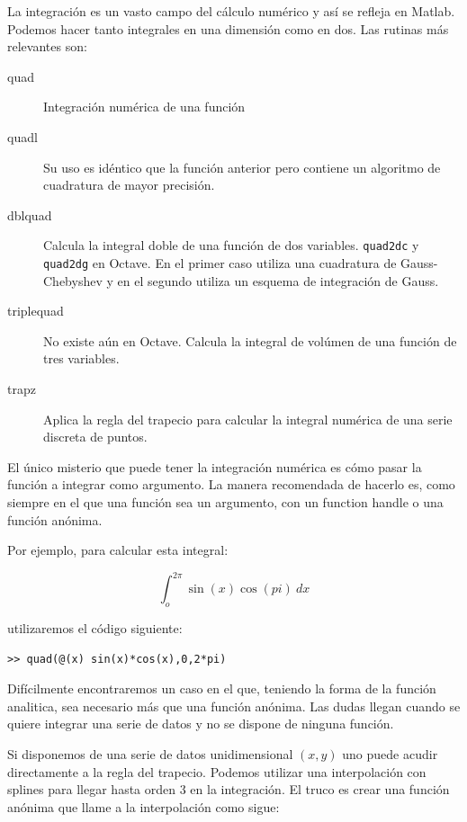 La integración es un vasto campo del cálculo numérico y así
se refleja en Matlab. Podemos hacer tanto integrales en una dimensión
como en dos. Las rutinas más relevantes son:

\begin{description}
\item [quad\texttt{}]Integración numérica de una función
\item [quadl\texttt{}]Su uso es idéntico que la función
  anterior pero contiene un algoritmo de cuadratura de mayor
  precisión.
\item [dblquad\texttt{}] Calcula la integral
  doble de una función de dos variables. \texttt{quad2dc}
  y \texttt{quad2dg} en Octave.  En el primer caso
  utiliza una cuadratura de Gauss-Chebyshev y en el segundo utiliza un
  esquema de integración de Gauss.
\item [triplequad\texttt{}]No existe aún en Octave.
  Calcula la integral de volúmen de una función de tres variables.
\item [trapz\texttt{}]Aplica la regla del trapecio para
  calcular la integral numérica de una serie discreta de puntos.
\end{description}

El único misterio que puede tener la integración numérica es cómo
pasar la función a integrar como argumento.  La manera recomendada de
hacerlo es, como siempre en el que una función sea un argumento, con
un function handle o una función anónima.

Por ejemplo, para calcular esta integral:

\[  \int_o^{2\pi} \sin(x)\cos(pi)\ dx\]

utilizaremos el código siguiente:

\begin{verbatim}
>> quad(@(x) sin(x)*cos(x),0,2*pi)
\end{verbatim}

Difícilmente encontraremos un caso en el que, teniendo la forma de la
función analitica, sea necesario más que una función anónima.  Las
dudas llegan cuando se quiere integrar una serie de datos y no se
dispone de ninguna función.

Si disponemos de una serie de datos unidimensional $(x,y)$ uno puede
acudir directamente a la regla del trapecio.  Podemos utilizar una
interpolación con splines para llegar hasta orden 3 en la
integración. El truco es crear una función anónima que llame a la
interpolación como sigue:

